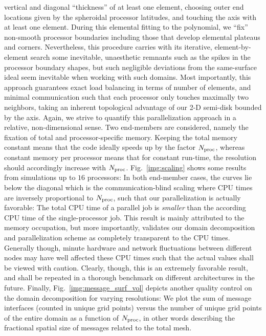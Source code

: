 vertical and diagonal ``thickness'' of at least one element,
choosing outer end locations given by the 
spheroidal processor latitudes, and touching the axis with at least one 
element. During this elemental fitting to the polynomial, 
we ``fix'' non-smooth processor boundaries including those that 
develop elemental plateaus and corners.
%
Nevertheless, this procedure carries with its iterative, element-by-element 
search some inevitable, unaesthetic remnants such as the spikes in the processor 
boundary shapes, but such negligible deviations from the same-surface ideal 
seem inevitable when working with such domains.  
Most importantly, this approach guarantees exact load balancing in terms of 
number of elements, and minimal communication such that each processor only 
touches maximally two neighbors, taking an inherent topological 
advantage of our 2-D semi-disk bounded by the axis. 
%
%
Again, we strive to quantify this parallelization approach in a 
relative, non-dimensional sense. Two end-members are considered, 
namely the fixation of total and processor-specific memory. 
Keeping the total memory constant means that the code ideally speeds up 
by the factor $N_{\rm proc}$, whereas constant memory per processor means 
that for constant run-time, the resolution should accordingly 
increase with $N_{\rm proc}$. Fig.~\ref{img:scaling} shows some results from 
simulations up to $16$ processors: In both end-member cases, the curves lie 
below the diagonal which is the communication-blind scaling where CPU times 
are inversely proportional to $N_{\rm proc}$, such that our parallelization is 
actually favorable: The total CPU time of a parallel job is \textit{smaller} than 
the according CPU time of the single-processor job. This result is mainly attributed 
to the memory occupation, but more importantly, validates our domain decomposition 
and parallelization scheme as completely transparent to the CPU times. Generally though, 
minute hardware and network fluctuations between different nodes may have well affected
these CPU times such that the actual values shall be viewed with caution. Clearly, though, 
this is an extremely favorable result, and shall be repeated in a thorough benchmark 
on different architectures in the future.  
%
Finally, Fig.~\ref{img:message_surf_vol} depicts another quality control on the
domain decomposition for varying resolutions: We plot the sum of message
interfaces (counted in unique grid points) versus the number of unique grid
points of the entire domain as a function of $N_{\rm proc}$, in other
words describing the fractional spatial size of messages related to the total mesh. 
